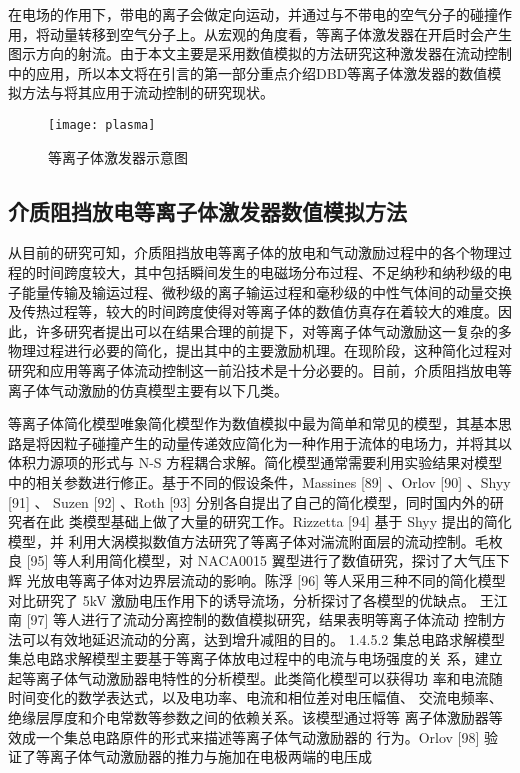 在电场的作用下，带电的离子会做定向运动，并通过与不带电的空气分子的碰撞作用，将动量转移到空气分子上。从宏观的角度看，等离子体激发器在开启时会产生图示方向的射流。由于本文主要是采用数值模拟的方法研究这种激发器在流动控制中的应用，所以本文将在引言的第一部分重点介绍DBD等离子体激发器的数值模拟方法与将其应用于流动控制的研究现状。
\begin{figure}
  \centering
  \texttt{[image: plasma]}
  \caption{等离子体激发器示意图\cite{Whalley2012}}\label{fig:SchematicPlasma}
\end{figure}

\subsection{介质阻挡放电等离子体激发器数值模拟方法}
从目前的研究可知，介质阻挡放电等离子体的放电和气动激励过程中的各个物理过程的时间跨度较大，其中包括瞬间发生的电磁场分布过程、不足纳秒和纳秒级的电子能量传输及输运过程、微秒级的离子输运过程和毫秒级的中性气体间的动量交换及传热过程等，较大的时间跨度使得对等离子体的数值仿真存在着较大的难度。因此，许多研究者提出可以在结果合理的前提下，对等离子体气动激励这一复杂的多物理过程进行必要的简化，提出其中的主要激励机理。在现阶段，这种简化过程对研究和应用等离子体流动控制这一前沿技术是十分必要的。目前，介质阻挡放电等离子体气动激励的仿真模型主要有以下几类。

等离子体简化模型唯象简化模型作为数值模拟中最为简单和常见的模型，其基本思路是将因粒子碰撞产生的动量传递效应简化为一种作用于流体的电场力，并将其以体积力源项的形式与 N-S 方程耦合求解。简化模型通常需要利用实验结果对模型中的相关参数进行修正。基于不同的假设条件，Massines
[89]
、Orlov
[90]
、Shyy
[91]
、
Suzen
[92]
、Roth
[93]
分别各自提出了自己的简化模型，同时国内外的研究者在此
类模型基础上做了大量的研究工作。Rizzetta
[94]
基于 Shyy 提出的简化模型，并
利用大涡模拟数值方法研究了等离子体对湍流附面层的流动控制。毛枚良
[95]
等人利用简化模型，对 NACA0015 翼型进行了数值研究，探讨了大气压下辉
光放电等离子体对边界层流动的影响。陈浮
[96]
等人采用三种不同的简化模型
对比研究了 5kV 激励电压作用下的诱导流场，分析探讨了各模型的优缺点。
王江南
[97]
等人进行了流动分离控制的数值模拟研究，结果表明等离子体流动
控制方法可以有效地延迟流动的分离，达到增升减阻的目的。
1.4.5.2 集总电路求解模型
集总电路求解模型主要基于等离子体放电过程中的电流与电场强度的关
系，建立起等离子体气动激励器电特性的分析模型。此类简化模型可以获得功
率和电流随时间变化的数学表达式，以及电功率、电流和相位差对电压幅值、
交流电频率、绝缘层厚度和介电常数等参数之间的依赖关系。该模型通过将等
离子体激励器等效成一个集总电路原件的形式来描述等离子体气动激励器的
行为。Orlov
[98]
验证了等离子体气动激励器的推力与施加在电极两端的电压成

